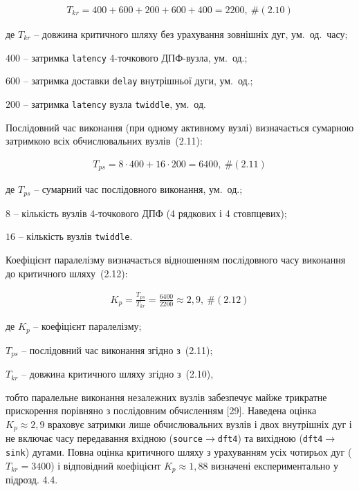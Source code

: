 \documentclass[
]{article}
\newcommand{\passthrough}[1]{#1}
\begin{document}
\[\begin{array}{r}
T_{kr} = 400 + 600 + 200 + 600 + 400 = 2200,\ \#(2.10)
\end{array}\]

де \(T_{kr}\) -- довжина критичного шляху без урахування зовнішніх дуг,
ум.~од.~часу;

\(400\) -- затримка \passthrough{\lstinline!latency!} 4-точкового
ДПФ-вузла, ум.~од.;

\(600\) -- затримка доставки \passthrough{\lstinline!delay!} внутрішньої
дуги, ум.~од.;

\(200\) -- затримка \passthrough{\lstinline!latency!} вузла
\passthrough{\lstinline!twiddle!}, ум.~од.

Послідовний час виконання (при одному активному вузлі) визначається
сумарною затримкою всіх обчислювальних вузлів~(2.11):

\[\begin{array}{r}
T_{ps} = 8 \cdot 400 + 16 \cdot 200 = 6400,\ \#(2.11)
\end{array}\]

де \(T_{ps}\) -- сумарний час послідовного виконання, ум.~од.;

\(8\) -- кількість вузлів 4-точкового ДПФ (4 рядкових і 4 стовпцевих);

\(16\) -- кількість вузлів \passthrough{\lstinline!twiddle!}.

Коефіцієнт паралелізму визначається відношенням послідовного часу
виконання до критичного шляху~(2.12):

\[\begin{array}{r}
K_{p} = \frac{T_{ps}}{T_{kr}} = \frac{6400}{2200} \approx 2,9,\ \#(2.12)
\end{array}\]

де \(K_{p}\) -- коефіцієнт паралелізму;

\(T_{ps}\) -- послідовний час виконання згідно з~(2.11);

\(T_{kr}\) -- довжина критичного шляху згідно з~(2.10),

тобто паралельне виконання незалежних вузлів забезпечує майже трикратне
прискорення порівняно з послідовним обчисленням {[}29{]}. Наведена
оцінка \(K_{p} \approx 2,9\) враховує затримки лише обчислювальних
вузлів і двох внутрішніх дуг і не включає часу передавання вхідною
(\passthrough{\lstinline!source!}\(\rightarrow\)\passthrough{\lstinline!dft4!})
та вихідною
(\passthrough{\lstinline!dft4!}\(\rightarrow\)\passthrough{\lstinline!sink!})
дугами. Повна оцінка критичного шляху з урахуванням усіх чотирьох дуг
(\(T_{kr} = 3400\)) і відповідний коефіцієнт \(K_{p} \approx 1,88\)
визначені експериментально у підрозд. 4.4.
\end{document}
